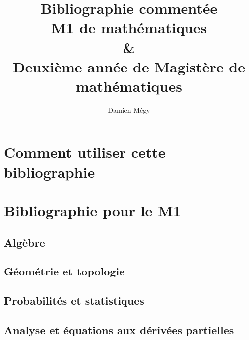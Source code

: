 \documentclass{article}
\begin{document}
\author{Damien Mégy}
\title{Bibliographie commentée\\M1 de mathématiques \\ \&\\ Deuxième année de Magistère de mathématiques}

\maketitle
\tableofcontents


\section*{Comment utiliser cette bibliographie}

\newpage
\section{Bibliographie pour le M1}

\subsection{Algèbre}

\subsection{Géométrie et topologie}

\subsection{Probabilités et statistiques}

\subsection{Analyse et équations aux dérivées partielles}
\end{document}
